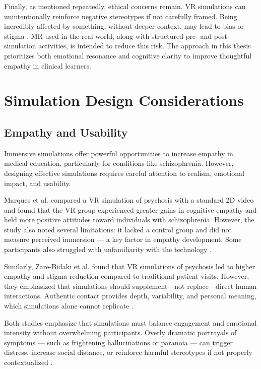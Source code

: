 Finally, as mentioned repeatedly, ethical concerns remain. VR simulations can unintentionally reinforce negative stereotypes if not carefully framed. Being incredibly affected by something, without deeper context, may lead to bias or stigma \cite{Rueda2020}. MR used in the real world, along with structured pre- and post-simulation activities, is intended to reduce this risk. The approach in this thesis prioritizes both emotional resonance and cognitive clarity to improve thoughtful empathy in clinical learners.


\section{Simulation Design Considerations}
\subsection{Empathy and Usability}
Immersive simulations offer powerful opportunities to increase empathy in medical education, particularly for conditions like schizophrenia. However, designing effective simulations requires careful attention to realism, emotional impact, and usability.

Marques et al. compared a VR simulation of psychosis with a standard 2D video and found that the VR group experienced greater gains in cognitive empathy and held more positive attitudes toward individuals with schizophrenia. However, the study also noted several limitations: it lacked a control group and did not measure perceived immersion — a key factor in empathy development. Some participants also struggled with unfamiliarity with the technology \cite{Marques2022}.

Similarly, Zare-Bidaki et al. found that VR simulations of psychosis led to higher empathy and stigma reduction compared to traditional patient visits. However, they emphasized that simulations should supplement—not replace—direct human interactions. Authentic contact provides depth, variability, and personal meaning, which simulations alone cannot replicate \cite{Zare-Bidaki2022, Hsia2022}.

Both studies emphasize that simulations must balance engagement and emotional intensity without overwhelming participants. Overly dramatic portrayals of symptoms — such as frightening hallucinations or paranoia — can trigger distress, increase social distance, or reinforce harmful stereotypes if not properly contextualized \cite{Ando2011, Chaffin2013, Zare-Bidaki2022}.

